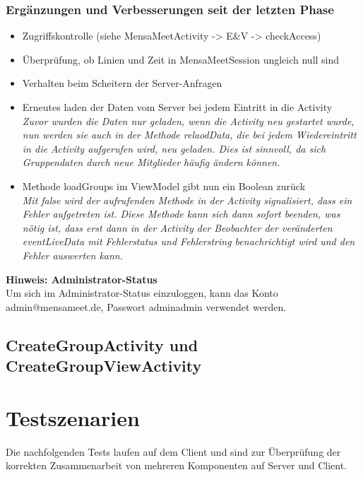 \documentclass[a4paper]{scrreprt}
\begin{document}
\subsubsection{Ergänzungen und Verbesserungen seit der letzten Phase}
\begin{itemize}
\item Zugriffskontrolle (siehe MensaMeetActivity -> E\&V -> checkAccess)
\item Überprüfung, ob Linien und Zeit in MensaMeetSession ungleich null sind
\item Verhalten beim Scheitern der Server-Anfragen
\item Erneutes laden der Daten vom Server bei jedem Eintritt in die Activity\\
\textit{Zuvor wurden die Daten nur geladen, wenn die Activity neu gestartet wurde, nun werden sie auch in der Methode relaodData, die bei jedem Wiedereintritt in die Activity aufgerufen wird, neu geladen. Dies ist sinnvoll, da sich Gruppendaten durch neue Mitglieder häufig ändern können.}
\item Methode loadGroups im ViewModel gibt nun ein Boolean zurück \\
\textit{Mit false wird der aufrufenden Methode in der Activity signalisiert, dass ein Fehler aufgetreten ist. Diese Methode kann sich dann sofort beenden, was nötig ist, dass erst dann in der Activity der Beobachter der veränderten eventLiveData mit Fehlerstatus und Fehlerstring benachrichtigt wird und den Fehler auswerten kann.} \\
\end{itemize}

\textbf{Hinweis: Administrator-Status} \\
Um sich im Administrator-Status einzuloggen, kann das Konto admin@mensameet.de, Passwort adminadmin verwendet werden.  

\subsection{CreateGroupActivity und CreateGroupViewActivity}






\section{Testszenarien}

Die nachfolgenden Tests laufen auf dem Client und sind zur Überprüfung der korrekten Zusammenarbeit von mehreren Komponenten auf Server und Client.
\end{document}
